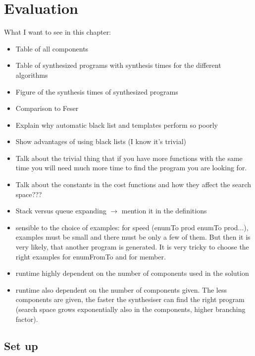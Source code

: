 \chapter{Evaluation} \label{evaluation}

What I want to see in this chapter:
\begin{itemize}
\item Table of all components
\item Table of synthesized programs with synthesis times for the different algorithms
\item Figure of the synthesis times of synthesized programs
\item Comparison to Feser
\item Explain why automatic black list and templates perform so poorly
\item Show advantages of using black lists (I know it's trivial)
\item Talk about the trivial thing that if you have more functions with the same time you will need much more time to find the program you are looking for.
\item Talk about the constants in the cost functions and how they affect the search space???
\item Stack versus queue expanding $\rightarrow$ mention it in the definitions
\end{itemize}


\begin{itemize}
\item sensible to the choice of examples: for speed (enumTo prod enumTo prod...), examples must be small and there must be only a few of them. But then it is very likely, that another program is generated. It is very tricky to choose the right examples for enumFromTo and for member.
\item runtime highly dependent on the number of components used in the solution 
\item runtime also dependent on the number of components given. The less components are given, the faster the synthesiser can find the right program (search space grows exponentially also in the components, higher branching factor).
\end{itemize}

\section{Set up}
  
